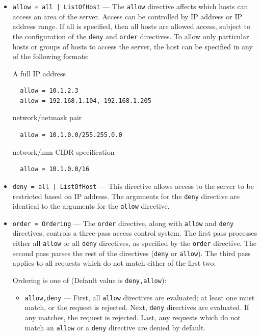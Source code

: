 \documentclass[11pt,oneside,english]{book}
\begin{document}
\begin{itemize}
\begin{itemize}
              \item \verb+allow = all | ListOfHost+ --- The \verb+allow+
                directive affects which hosts can access an area of the
                server. Access can be controlled by IP address or IP address
                range. If all is specified, then all hosts are allowed access,
                subject to the configuration of the \verb+deny+ and \verb+order+
                directives. To allow only particular hosts or groups of hosts to
                access the server, the host can be specified in any of the
                following formats:

                A full IP address
\begin{verbatim}
  allow = 10.1.2.3
  allow = 192.168.1.104, 192.168.1.205
\end{verbatim}
                network/netmask pair
\begin{verbatim}
  allow = 10.1.0.0/255.255.0.0
\end{verbatim}
                network/nnn CIDR specification
\begin{verbatim}
  allow = 10.1.0.0/16
\end{verbatim}

              \item \verb+deny = all | ListOfHost+ --- This directive allows
                access to the server to be restricted based on IP address. The
                arguments for the \verb+deny+ directive are identical to the
                arguments for the \verb+allow+ directive.

              \item \verb+order = Ordering+ --- The \verb+order+ directive,
                along with \verb+allow+ and \verb+deny+ directives, controls a
                three-pass access control system. The first pass processes
                either all \verb+allow+ or all \verb+deny+ directives, as
                specified by the \verb+order+ directive. The second pass parses
                the rest of the directives (\verb+deny+ or \verb+allow+). The
                third pass applies to all requests which do not match either of
                the first two.

                Ordering is one of (Default value is \verb+deny,allow+):
                \begin{itemize}
                  \item \verb+allow,deny+ --- First, all \verb+allow+ directives
                    are evaluated; at least one must match, or the request is
                    rejected. Next, \verb+deny+ directives are evaluated. If any
                    matches, the request is rejected. Last, any requests which
                    do not match an \verb+allow+ or a \verb+deny+ directive are
                    denied by default.


\end{itemize}
\end{itemize}
\end{itemize}
\end{document}
